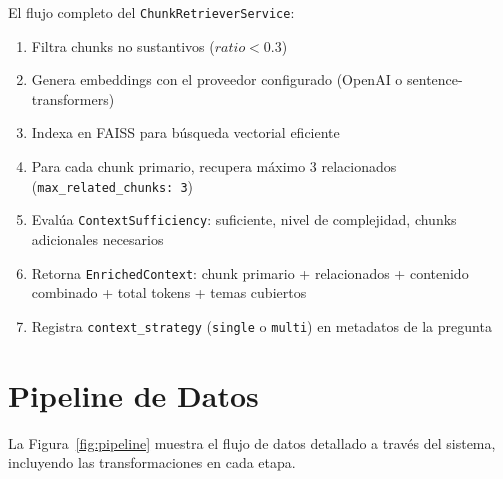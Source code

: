 \documentclass[10pt,twocolumn,letterpaper]{article}
\begin{document}
El flujo completo del \texttt{ChunkRetrieverService}:

\begin{enumerate}[nosep,leftmargin=*]
  \item Filtra chunks no sustantivos ($ratio < 0.3$)
  \item Genera embeddings con el proveedor configurado (OpenAI o sentence-transformers)
  \item Indexa en FAISS para b\'usqueda vectorial eficiente
  \item Para cada chunk primario, recupera m\'aximo 3 relacionados
        (\texttt{max\_related\_chunks: 3})
  \item Eval\'ua \texttt{ContextSufficiency}: suficiente, nivel de complejidad,
        chunks adicionales necesarios
  \item Retorna \texttt{EnrichedContext}: chunk primario + relacionados +
        contenido combinado + total tokens + temas cubiertos
  \item Registra \texttt{context\_strategy} (\texttt{single} o \texttt{multi})
        en metadatos de la pregunta
\end{enumerate}

\section{Pipeline de Datos}

La Figura~\ref{fig:pipeline} muestra el flujo de datos detallado a trav\'es del
sistema, incluyendo las transformaciones en cada etapa.
\end{document}
